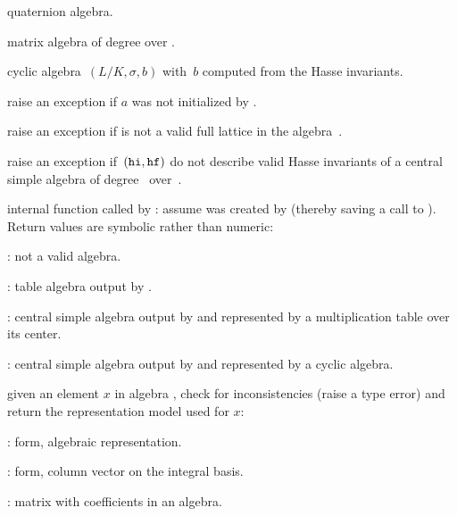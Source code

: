 quaternion algebra.

matrix algebra of degree  over .

cyclic algebra~$(L/K,\sigma,b)$ with~$b$ computed from the Hasse invariants.


 raise an exception if $a$ was not initialized
by .

 raise an exception if  is not a
valid full lattice in the algebra~.

 raise an exception
if~$({\tt hi},{\tt hf})$ do not describe valid Hasse invariants of a central
simple algebra of degree~ over~.

 internal function called by : assume
 was created by  (thereby saving a call to ).
Return values are symbolic rather than numeric:

\item {}: not a valid algebra.

\item {}: table algebra output by .

\item {}: central simple algebra output by  and
represented by a multiplication table over its center.

\item {}: central  simple  algebra  output  by  and
represented by a cyclic algebra.

 given an element $x$ in algebra ,
check for inconsistencies (raise a type error) and return the representation
model used for $x$:

\item {}:  form, algebraic representation.

\item {}:  form, column vector on the integral
basis.

\item {}: matrix with coefficients in an algebra.

